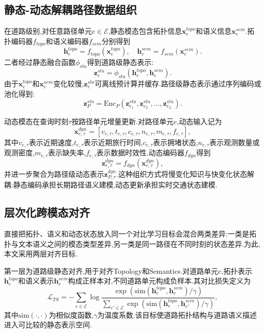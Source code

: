 \documentclass{rjthesis}
\begin{document}
\subsection{静态-动态解耦路径数据组织}

在道路级别,对任意路径单元$e\in\mathcal{E}$,静态模态包含拓扑信息$\mathbf{x}^{topo}_{e}$和语义信息$\mathbf{x}^{sem}_{e}$.拓扑编码器$f_{topo}$和语义编码器$f_{sem}$分别得到
\begin{equation}
	\mathbf{h}^{topo}_{e}=f_{topo}(\mathbf{x}^{topo}_{e}),\quad
	\mathbf{h}^{sem}_{e}=f_{sem}(\mathbf{x}^{sem}_{e}).
\end{equation}
二者经过静态融合函数$\phi_{sta}$得到道路级静态表示:
\begin{equation}
	\mathbf{z}^{sta}_{e}=\phi_{sta}(\mathbf{h}^{topo}_{e},\mathbf{h}^{sem}_{e}).
\end{equation}
由于$\mathbf{x}^{topo}_{e}$和$\mathbf{x}^{sem}_{e}$变化较慢,$\mathbf{z}^{sta}_{e}$可离线预计算并缓存.路径级静态表示通过序列编码或池化得到:
\begin{equation}
	\mathbf{z}^{sta}_{P}=\mathrm{Enc}_{P}\left(\mathbf{z}^{sta}_{e_1},\mathbf{z}^{sta}_{e_2},\ldots,\mathbf{z}^{sta}_{e_L}\right).
\end{equation}

动态模态在查询时刻$\tau$按路径单元增量更新.对路径单元$e$,动态输入记为
\begin{equation}
	\mathbf{x}^{dyn}_{e,\tau}=[v_{e,\tau},t_{e,\tau},c_{e,\tau},n_{e,\tau},m_{e,\tau},f_{e,\tau}],
\end{equation}
其中$v_{e,\tau}$表示近期速度,$t_{e,\tau}$表示近期旅行时间,$c_{e,\tau}$表示拥堵状态,$n_{e,\tau}$表示观测数量或观测密度,$m_{e,\tau}$表示缺失率,$f_{e,\tau}$表示数据时效性.动态编码器$f_{dyn}$得到
\begin{equation}
	\mathbf{z}^{dyn}_{e,\tau}=f_{dyn}(\mathbf{x}^{dyn}_{e,\tau}),
\end{equation}
并进一步聚合为路径级动态表示$\mathbf{z}^{dyn}_{P,\tau}$.这种组织方式将慢变化知识与快变化状态解耦:静态编码承担长期路径语义建模,动态更新承担实时交通状态建模.

\subsection{层次化跨模态对齐}

直接把拓扑、语义和动态状态放入同一个对比学习目标会混合两类差异:一类是拓扑与文本语义之间的模态类型差异,另一类是同一路径在不同时刻的状态差异.为此,本文采用两层对齐目标.

第一层为道路级静态对齐,用于对齐Topology和Semantics.对道路单元$e$,拓扑表示$\mathbf{h}^{topo}_{e}$和语义表示$\mathbf{h}^{sem}_{e}$构成正样本对,不同道路单元构成负样本.其对比损失定义为
\begin{equation}
	\mathcal{L}_{TS}
	=-\sum_{e\in\mathcal{E}}
	\log
	\frac{\exp(\mathrm{sim}(\mathbf{h}^{topo}_{e},\mathbf{h}^{sem}_{e})/\gamma)}
	{\sum_{e'\in\mathcal{E}}\exp(\mathrm{sim}(\mathbf{h}^{topo}_{e},\mathbf{h}^{sem}_{e'})/\gamma)},
\end{equation}
其中$\mathrm{sim}(\cdot,\cdot)$为相似度函数,$\gamma$为温度系数.该目标使道路拓扑结构与道路语义描述进入可比较的静态表示空间.
\end{document}
